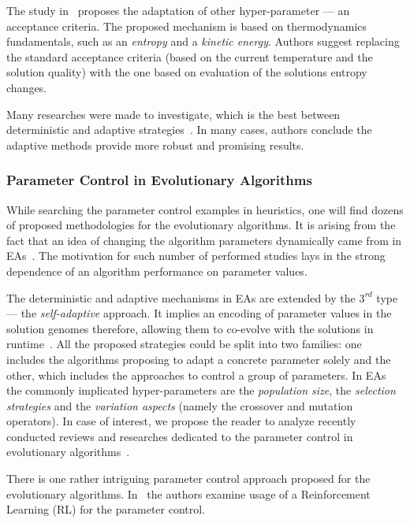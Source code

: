 The study in~\cite{ghandeshtani2019entropy} proposes the adaptation of other hyper-parameter — an acceptance criteria. The proposed mechanism is based on thermodynamics fundamentals, such as an \emph{entropy} and a \emph{kinetic energy}. Authors suggest replacing the standard acceptance criteria (based on the current temperature and the solution quality) with the one based on evaluation of the solutions entropy changes.

Many researches were made to investigate, which is the best between deterministic and adaptive strategies~\cite{thompson1995general,ingber2000adaptive,de2003placement,azizi2004adaptive,lou2016parallel}. In many cases, authors conclude the adaptive methods provide more robust and promising results.


\subsubsection{Parameter Control in Evolutionary Algorithms}
While searching the parameter control examples in heuristics, one will find dozens of proposed methodologies for the evolutionary algorithms. It is arising from the fact that an idea of changing the algorithm parameters dynamically came from in EAs~\cite{karafotias2014parameter}. The motivation for such number of performed studies lays in the strong dependence of an algorithm performance on parameter values. 

The deterministic and adaptive mechanisms in EAs are extended by the $3^{rd}$ type — the \emph{self-adaptive} approach. It implies an encoding of parameter values in the solution genomes therefore, allowing them to co-evolve with the solutions in runtime~\cite{doerr2020theory}. All the proposed strategies could be split into two families: one includes the algorithms proposing to adapt a concrete parameter solely and the other, which includes the approaches to control a group of parameters. In EAs the commonly implicated hyper-parameters are the \emph{population size}, the \emph{selection strategies} and the \emph{variation aspects} (namely the crossover and mutation operators). In case of interest, we propose the reader to analyze recently conducted reviews and researches dedicated to the parameter control in evolutionary algorithms~\cite{karafotias2014parameter,aleti2016systematic,smith2020self,doerr2020theory}.

There is one rather intriguing parameter control approach proposed for the evolutionary algorithms. In~\cite{karafotias2014generic} the authors examine usage of a Reinforcement Learning (RL) for the parameter control.


